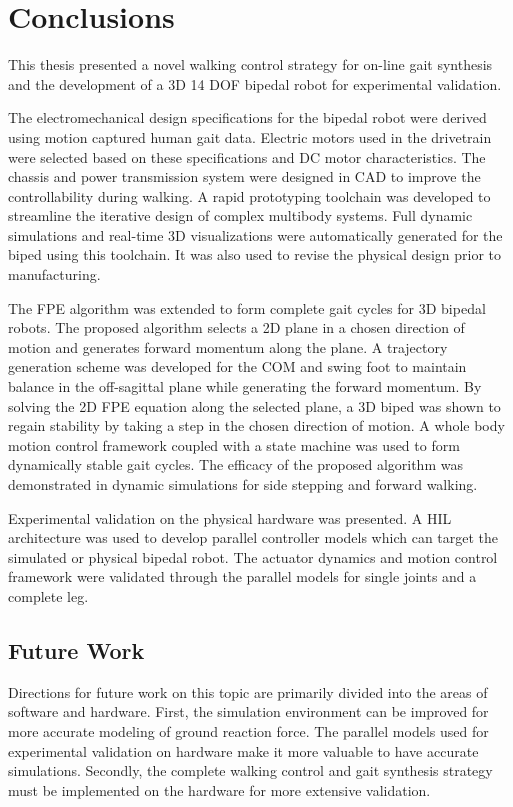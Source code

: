 \chapter{Conclusions} %
\label{cha:conclusion}

This thesis presented a novel walking control strategy for on-line gait synthesis and the development of a 3D 14 DOF bipedal robot for experimental validation. 

The electromechanical design specifications for the bipedal robot were  derived using motion captured human gait data. Electric motors used in the drivetrain were selected based on these specifications and DC motor characteristics. The chassis and power transmission system were designed in CAD to improve the controllability during walking. A rapid prototyping toolchain was developed to streamline the iterative design of complex multibody systems. Full dynamic simulations and real-time 3D visualizations were automatically generated for the biped using this toolchain. It was also used to revise the physical design prior to manufacturing. 

The FPE algorithm was extended to form complete gait cycles for 3D bipedal robots. The proposed algorithm selects a 2D plane in a chosen direction of motion and generates forward momentum along the plane. A trajectory generation scheme was developed for the COM and swing foot to maintain balance in the off-sagittal plane while generating the forward momentum. By solving the 2D FPE equation along the selected plane, a 3D biped was shown to regain stability by taking a step in the chosen direction of motion. A whole body motion control framework coupled with a state machine was used to form dynamically stable gait cycles. The efficacy of the proposed algorithm was demonstrated in dynamic simulations for side stepping and forward walking. 

Experimental validation on the physical hardware was presented. A HIL architecture was used to develop parallel controller models which can target the simulated or physical bipedal robot. The actuator dynamics and motion control framework were validated through the parallel models for single joints and a complete leg.  

\section{Future Work} %
\label{sec:future_work}
Directions for future work on this topic are primarily divided into the areas of software and hardware. First, the simulation environment can be improved for more accurate modeling of ground reaction force. The parallel models used for experimental validation on hardware make it more valuable to have accurate simulations. Secondly, the complete walking control and gait synthesis strategy must be implemented on the hardware for more extensive validation. 

